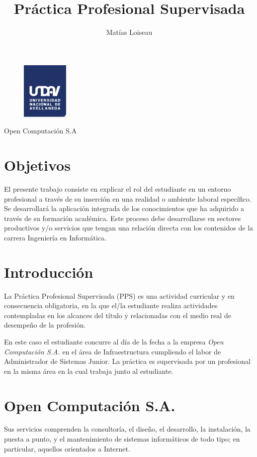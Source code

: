 \documentclass[12pt,a4paper]{article}
\author{Matías Loiseau}
\title{Práctica Profesional Supervisada}
\begin{document}
\begin{figure}
  \centering
   \includegraphics[width=0.2\textwidth]{undav-logo}
  \label{fig:ejemplo}
\end{figure}
\maketitle       %
\begin{center}
Open Computación S.A 
\end{center}
\cleardoublepage

\tableofcontents %
\cleardoublepage

\section{Objetivos}
El presente trabajo consiste en explicar el rol del estudiante en un entorno profesional a través de su inserción en una realidad o ambiente laboral específico. Se desarrollará la aplicación integrada de los conocimientos que ha adquirido a través de su formación académica. Este proceso debe desarrollarse en sectores productivos y/o servicios que tengan una relación directa con los contenidos de la carrera Ingeniería en Informática.

\section{Introducción}
La Práctica Profesional Supervisada (PPS) es una actividad curricular y en consecuencia obligatoria, en la que el/la estudiante realiza actividades contempladas en los alcances del título y relacionadas con el medio real de desempeño de la profesión.

En este caso el estudiante concurre al día de la fecha a la empresa \emph{Open Computación S.A.} en el área de Infraestructura cumpliendo el labor de Administrador de Sistemas Junior. La práctica es supervisada por un profesional en la misma área en la cual trabaja junto al estudiante.

\section{Open Computación S.A.}
Sus servicios comprenden la consultoría, el diseño, el desarrollo, la instalación, la puesta a punto, y el mantenimiento de sistemas informáticos de todo tipo; en particular, aquellos orientados a Internet.
\end{document}
